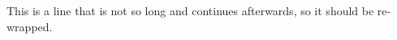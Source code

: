 \documentclass{article}
\begin{document}
This is a line that is not so long and continues afterwards, so it
should be re-wrapped.
\end{document}
